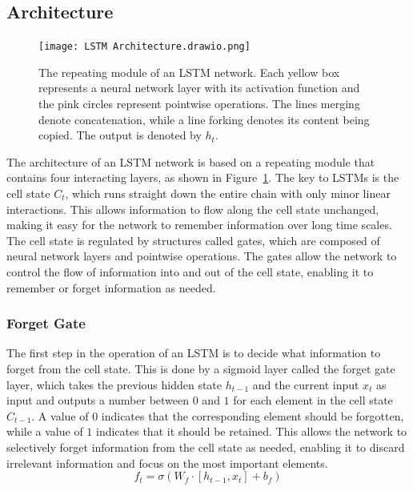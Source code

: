 \documentclass{article}
\newcommand{\reffig}[1]{Figure~\ref{#1}}
\begin{document}
\subsection{Architecture}
\label{sec:3.0}

\begin{figure}
  \centering
  \texttt{[image: LSTM Architecture.drawio.png]}
  \caption{The repeating module of an LSTM network. Each yellow box represents a neural
    network layer with its activation function and the pink circles represent pointwise
    operations. The lines merging denote concatenation, while a line forking denotes its
    content being copied. The output is denoted by $h_t$. \cite{olahUnderstandingLSTM}}
  \label{fig:lstm}
\end{figure}

The architecture of an LSTM network is based on a repeating module that contains four
interacting layers, as shown in \reffig{fig:lstm}. The key to LSTMs is the cell state
$C_t$, which runs straight down the entire chain with only minor linear interactions. This
allows information to flow along the cell state unchanged, making it easy for the network
to remember information over long time scales. The cell state is regulated by structures
called gates, which are composed of neural network layers and pointwise operations. The
gates allow the network to control the flow of information into and out of the cell state,
enabling it to remember or forget information as needed.


\subsubsection{Forget Gate}
\label{sec:3.0.0}

The first step in the operation of an LSTM is to decide what information to forget from
the cell state. This is done by a sigmoid layer called the forget gate layer, which takes
the previous hidden state $h_{t-1}$ and the current input $x_t$ as input and outputs a
number between $0$ and $1$ for each element in the cell state $C_{t-1}$. A value of $0$
indicates that the corresponding element should be forgotten, while a value of $1$
indicates that it should be retained. This allows the network to selectively forget
information from the cell state as needed, enabling it to discard irrelevant information
and focus on the most important elements.
\begin{equation}
  f_t = \sigma(W_f \cdot [h_{t-1}, x_t] + b_f)
\end{equation}
\end{document}
